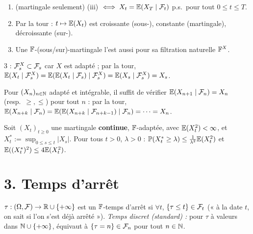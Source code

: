 \documentclass[11pt,a4paper]{article}
\begin{document}
\begin{proposition}\label{C8:prop-mart}\leavevmode
\begin{enumerate}
  \item (martingale seulement) (iii) $\iff X_t=\mathbb{E}(X_T\mid\mathcal{F}_t)$ p.s.\ pour tout $0\le t\le T$.
  \item Par la tour : $t\mapsto\mathbb{E}(X_t)$ est croissante (sous-), constante (martingale), décroissante (sur-).
  \item Une $\mathbb{F}$-(sous/sur)-martingale l'est aussi pour sa filtration naturelle $\mathbb{F}^X$.
\end{enumerate}
\end{proposition}
\begin{idee}
3 : $\mathcal{F}^X_s\subset\mathcal{F}_s$ car $X$ est adapté ; par la tour, $\mathbb{E}(X_t\mid\mathcal{F}_s^X)=\mathbb{E}(\mathbb{E}(X_t\mid\mathcal{F}_s)\mid\mathcal{F}^X_s)=\mathbb{E}(X_s\mid\mathcal{F}^X_s)=X_s$.
\end{idee}

\begin{horscours}\label{C8:discret}
Pour $(X_n)_{n\in\mathbb{N}}$ adapté et intégrable, il suffit de vérifier $\mathbb{E}(X_{n+1}\mid\mathcal{F}_n)=X_n$ (resp.\ $\ge,\le$) pour tout $n$ :
par la tour, $\mathbb{E}(X_{n+k}\mid\mathcal{F}_n)=\mathbb{E}(\mathbb{E}(X_{n+k}\mid\mathcal{F}_{n+k-1})\mid\mathcal{F}_n)=\dots=X_n$.
\end{horscours}

\begin{theoreme}\label{C8:doob}
Soit $(X_t)_{t\ge0}$ une martingale \textbf{continue}, $\mathbb{F}$-adaptée, avec $\mathbb{E}(X_t^2)<\infty$, et $X_t^*:=\sup_{0\le s\le t}|X_s|$.
Pour tous $t>0$, $\lambda>0$ : $\mathbb{P}(X^*_t\ge\lambda)\le\frac1{\lambda^2}\mathbb{E}(X_t^2)$ et $\mathbb{E}((X^*_t)^2)\le4\mathbb{E}(X_t^2)$.
\end{theoreme}

\section*{3. Temps d'arrêt}

\begin{definition}\label{C8:ta}
$\tau:(\Omega,\mathcal{F})\to\mathbb{R}\cup\{+\infty\}$ est un $\mathbb{F}$-temps d'arrêt si $\forall t$, $\{\tau\le t\}\in\mathcal{F}_t$
(« à la date $t$, on sait si l'on s'est déjà arrêté »).
\emph{Temps discret (standard) :} pour $\tau$ à valeurs dans $\mathbb{N}\cup\{+\infty\}$, équivaut à $\{\tau=n\}\in\mathcal{F}_n$ pour tout $n\in\mathbb{N}$.
\end{definition}
\end{document}
